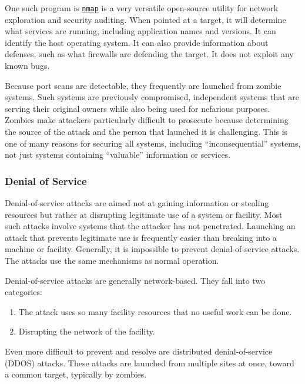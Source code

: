 One such program is \href{https://www.insecure.org/nmap/}{\texttt{nmap}} is a very versatile open-source utility for network exploration and security auditing.
When pointed at a target, it will determine what services are running, including application names and versions.
It can identify the host operating system.
It can also provide information about defenses, such as what firewalls are defending the target.
It does not exploit any known bugs.

Because port scans are detectable, they frequently are launched from zombie systems.
Such systems are previously compromised, independent systems that are serving their original owners while also being used for nefarious purposes.
Zombies make attackers particularly difficult to prosecute because determining the source of the attack and the person that launched it is challenging.
This is one of many reasons for securing all systems, including ``inconsequential'' systems, not just systems containing ``valuable'' information or services.

\subsubsection{Denial of Service}\label{subsubsec:Denial_of_Service}
Denial-of-service attacks are aimed not at gaining information or stealing resources but rather at disrupting legitimate use of a system or facility.
Most such attacks involve systems that the attacker has not penetrated.
Launching an attack that prevents legitimate use is frequently easier than breaking into a machine or facility.
Generally, it is impossible to prevent denial-of-service attacks.
The attacks use the same mechanisms as normal operation.

Denial-of-service attacks are generally network-based.
They fall into two categories:
\begin{enumerate}[noitemsep]
\item The attack uses so many facility resources that no useful work can be done.
\item Disrupting the network of the facility.
\end{enumerate}

Even more difficult to prevent and resolve are distributed denial-of-service (DDOS) attacks.
These attacks are launched from multiple sites at once, toward a common target, typically by zombies.

